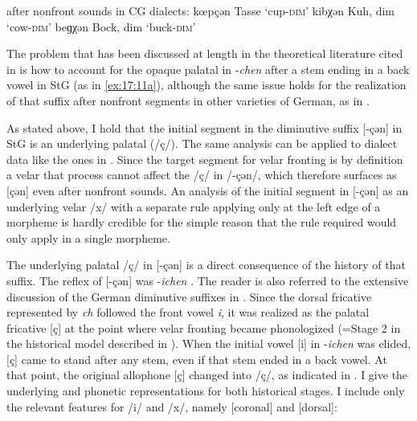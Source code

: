 \ea%
\label{ex:17:13}\relax[-çən] after nonfront sounds in CG dialects:
\ea kœpçən \tab [kœpçən] \tab Tasse     \tab ‘cup-\textsc{dim}’      \tab \citet[86]{Hasenclever1905}
\ex kibχən \tab [kibçən] \tab Kuh, dim  \tab ‘cow-\textsc{dim}’   \tab \citet[151]{Hofmann1926}
\ex beɡχən \tab [begçən] \tab Bock, dim \tab  ‘buck-\textsc{dim}’ \tab \citet[21]{Schirmer1932}
    \z
\z 

The problem that has been discussed at length in the theoretical literature cited in  is how to account for the opaque palatal in -\textit{chen} after a stem ending in a back vowel in StG (as in \ref{ex:17:11a}), although the same issue holds for the realization of that suffix after nonfront segments in other varieties of German, as in .

As stated above, I  hold that the initial segment in the diminutive suffix [-çən] in StG is an underlying palatal (/ç/). The same analysis can be applied to dialect data like the ones in . Since the target segment for velar fronting is by definition a velar that process cannot affect the /ç/ in /-çən/, which therefore surfaces as [çən] even after nonfront sounds. An analysis of the initial segment in [-çən] as an underlying velar /x/ with a separate rule applying only at the left edge of a morpheme is hardly credible for the simple reason that the rule required would only apply in a single morpheme.\pagebreak\largerpage

The underlying palatal /ç/ in [-çən] is a direct consequence of the history of that suffix. The  reflex of [-çən] was -\textit{ichen} \citep[171]{Seebold2011}. The reader is also referred to the extensive discussion of the German diminutive suffixes in \citet[475--488]{Schirmunski1962}. Since the dorsal fricative represented by \textit{ch} followed the front vowel \textit{i}, it was realized as the palatal fricative [ç] at the point where velar fronting became phonologized (=Stage 2 in the historical model described in ). When the initial vowel [i] in -\textit{ichen} was elided, [ç] came to stand after any stem, even if that stem ended in a back vowel. At that point, the original allophone [ç] changed into /ç/, as indicated in . I give the underlying and phonetic representations for both historical stages. I include only the relevant features for /i/ and /x/, namely [coronal] and [dorsal]:

